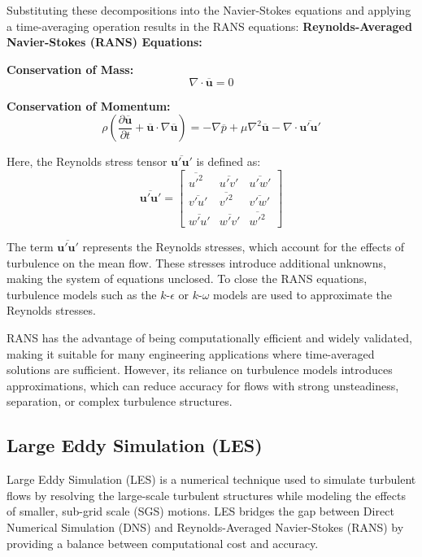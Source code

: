 Substituting these decompositions into the Navier-Stokes equations and applying a time-averaging operation results in the RANS equations:
\textbf{Reynolds-Averaged Navier-Stokes (RANS) Equations:}

\textbf{Conservation of Mass:}
\begin{equation}
\nabla \cdot \overline{\mathbf{u}} = 0
\end{equation}

\textbf{Conservation of Momentum:}
\begin{equation}
\rho \left( \frac{\partial \overline{\mathbf{u}}}{\partial t} + \overline{\mathbf{u}} \cdot \nabla \overline{\mathbf{u}} \right) = -\nabla \overline{p} + \mu \nabla^2 \overline{\mathbf{u}} - \nabla \cdot \overline{\mathbf{u}' \mathbf{u}'}
\end{equation}

Here, the Reynolds stress tensor $\overline{\mathbf{u}' \mathbf{u}'}$ is defined as:
\begin{equation}
\overline{\mathbf{u}' \mathbf{u}'} = 
\begin{bmatrix}
\overline{u'^2} & \overline{u'v'} & \overline{u'w'} \\
\overline{v'u'} & \overline{v'^2} & \overline{v'w'} \\
\overline{w'u'} & \overline{w'v'} & \overline{w'^2}
\end{bmatrix}
\end{equation}

The term $\overline{\mathbf{u}' \mathbf{u}'}$ represents the Reynolds stresses, 
which account for the effects of turbulence on the mean flow. 
These stresses introduce additional unknowns, making the system of equations unclosed. 
To close the RANS equations, turbulence models such as the $k$-$\epsilon$ or $k$-$\omega$ models are used to approximate the Reynolds stresses.

RANS has the advantage of being computationally efficient and widely validated, making it suitable for many engineering applications where time-averaged solutions are sufficient.
However, its reliance on turbulence models introduces approximations, which can reduce accuracy for flows with strong unsteadiness, separation, or complex turbulence structures.

\subsection{Large Eddy Simulation (LES)}
Large Eddy Simulation (LES) is a numerical technique used to simulate turbulent flows by resolving the large-scale turbulent structures 
while modeling the effects of smaller, sub-grid scale (SGS) motions. LES bridges the gap between Direct Numerical Simulation (DNS) 
and Reynolds-Averaged Navier-Stokes (RANS) by providing a balance between computational cost and accuracy.

